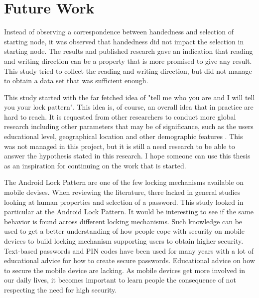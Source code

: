 
  \section{Future Work}

    Instead of observing a correspondence between handedness and selection of starting node, it was observed that handedness did not impact the selection in starting node. The results and published research gave an indication that reading and writing direction can be a property that is more promised to give any result. This study tried to collect the reading and writing direction, but did not manage to obtain a data set that was sufficient enough. 

    This study started with the far fetched idea of "tell me who you are and I will tell you your lock pattern". This idea is, of course, an overall idea that in practice are hard to reach. It is requested from other researchers to conduct more global research including other parameters that may be of significance, such as the users educational level, geographical location and other demographic features \cite{Andriotis}. This was not managed in this project, but it is still a need research to be able to answer the hypothesis stated in this research. I hope someone can use this thesis as an inspiration for continuing on the work that is started. 

    The Android Lock Pattern are one of the few locking mechanisms available on mobile devises. When reviewing the literature, there lacked in general studies looking at human properties and selection of a password. This study looked in particular at the Android Lock Pattern. It would be interesting to see if the same behavior is found across different locking mechanisms. Such knowledge can be used to get a better understanding of how people cope with security on mobile devices to build locking mechanism supporting users to obtain higher security. Text-based passwords and PIN codes have been used for many years with a lot of educational advice for how to create secure passwords. Educational advice on how to secure the mobile device are lacking. As mobile devices get more involved in our daily lives, it becomes important to learn people the consequence of not respecting the need for high security. 

    


